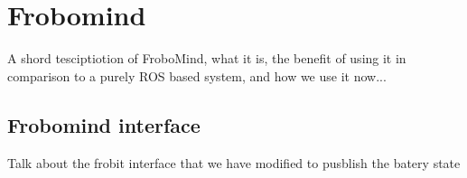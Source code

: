 \section{Frobomind} %
\label{sec:mr_frobomind}
A shord tesciptiotion of FroboMind, what it is, the benefit of using it in comparison to a purely ROS based system, and how we use it now...

	\subsection{Frobomind interface} %
	\label{sub:mr_frobomind_interface}
	Talk about the frobit interface that we have modified to pusblish the batery state
	


